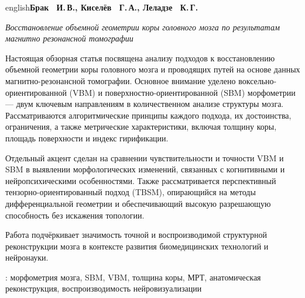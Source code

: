 \par \begin {otherlanguage*}{english}\makeatletter \textbf {Брак ~И.\unhbox \voidb@x \nobreak \,В.\unskip {}, \ignorespaces Киселёв ~Г.\unhbox \voidb@x \nobreak \,А.\unskip {}, \ignorespaces Леладзе ~К.\unhbox \voidb@x \nobreak \,Г.}\makeatother \par \textit {Восстановление объемной геометрии коры головного мозга по результатам магнитно резонансной томографии}\par Настоящая обзорная статья посвящена анализу подходов к восстановлению объемной геометрии коры головного мозга и проводящих путей на основе данных магнитно-резонансной томографии. Основное внимание уделено воксельно-ориентированной (VBM) и поверхностно-ориентированной (SBM) морфометрии — двум ключевым направлениям в количественном анализе структуры мозга. Рассматриваются алгоритмические принципы каждого подхода, их достоинства, ограничения, а также метрические характеристики, включая толщину коры, площадь поверхности и индекс гирификации. \par Отдельный акцент сделан на сравнении чувствительности и точности VBM и SBM в выявлении морфологических изменений, связанных с когнитивными и нейропсихическими особенностями. Также рассматривается перспективный тензорно-ориентированный подход (TBSM), опирающийся на методы дифференциальной геометрии и обеспечивающий высокую разрешающую способность без искажения топологии. \par Работа подчёркивает значимость точной и воспроизводимой структурной реконструкции мозга в контексте развития биомедицинских технологий и нейронауки. \par \keywordsname : морфометрия мозга, SBM, VBM, толщина коры, МРТ, анатомическая реконструкция, воспроизводимость нейровизуализации \par \end {otherlanguage*}\par \vspace \bigskipamount 
